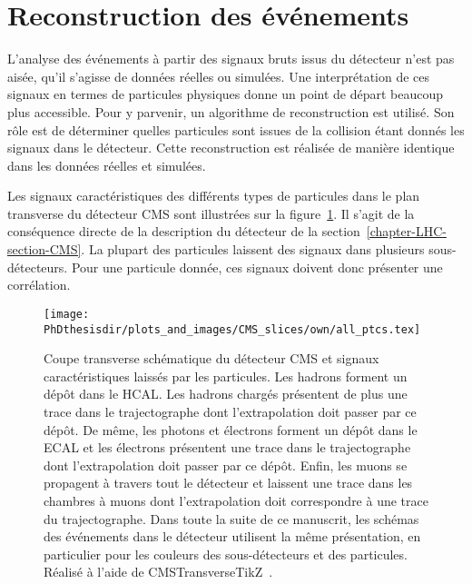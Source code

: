 \section{Reconstruction des événements}\label{chapter-LHC-section-evt_reco}
L'analyse des événements à partir des signaux bruts issus du détecteur n'est pas aisée, qu'il s'agisse de données réelles ou simulées.
Une interprétation de ces signaux en termes de particules physiques donne un point de départ beaucoup plus accessible.
Pour y parvenir, un algorithme de reconstruction est utilisé.
Son rôle est de déterminer quelles particules sont issues de la collision étant donnés les signaux dans le détecteur.
Cette reconstruction est réalisée de manière identique dans les données réelles et simulées.
\par
Les signaux caractéristiques des différents types de particules dans le plan transverse du détecteur CMS sont illustrées sur la figure~\ref{fig-chapter-LHC-section-evt_reco-cms_slice}.
Il s'agit de la conséquence directe de la description du détecteur de la section~\ref{chapter-LHC-section-CMS}.
La plupart des particules laissent des signaux dans plusieurs sous-détecteurs.
Pour une particule donnée, ces signaux doivent donc présenter une corrélation.
\begin{figure}[b]
\texttt{[image: \\PhDthesisdir/plots\_and\_images/CMS\_slices/own/all\_ptcs.tex]}
\caption[Coupe transverse schématique du détecteur CMS.]{Coupe transverse schématique du détecteur CMS et signaux caractéristiques laissés par les particules. Les hadrons forment un dépôt dans le HCAL. Les hadrons chargés présentent de plus une trace dans le trajectographe dont l'extrapolation doit passer par ce dépôt. De même, les photons et électrons forment un dépôt dans le ECAL et les électrons présentent une trace dans le trajectographe dont l'extrapolation doit passer par ce dépôt. Enfin, les muons se propagent à travers tout le détecteur et laissent une trace dans les chambres à muons dont l'extrapolation doit correspondre à une trace du trajectographe. Dans toute la suite de ce manuscrit, les schémas des événements dans le détecteur utilisent la même présentation, en particulier pour les couleurs des sous-détecteurs et des particules. Réalisé à l'aide de CMSTransverseTikZ~\cite{CMSTransverseTikZ}.}
\label{fig-chapter-LHC-section-evt_reco-cms_slice}
\end{figure}

